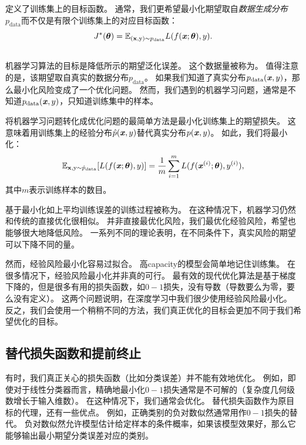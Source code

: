 定义了训练集上的目标函数。
通常，我们更希望最小化期望取自\emph{数据生成分布}$p_{\text{data}}$而不仅是有限个训练集上的对应目标函数：
\begin{equation}
\label{eq:8.2}
    J^*(\boldsymbol{\theta}) = \mathbb{E}_{(\mathbf{x}, \mathrm{y}) \sim p_\text{data}} L(f(\boldsymbol{\mathit{x}} ;\boldsymbol{\theta}),y).
\end{equation}

\subsection{}
\label{sec:empirical_risk_minimization}
机器学习算法的目标是降低所示的期望泛化误差。
这个数据量被称为。
值得注意的是，该期望取自真实的数据分布$p_\text{data}$。
如果我们知道了真实分布$p_\text{data}(\boldsymbol{\mathit{x}}, y)$，那么最小化风险变成了一个优化问题。
然而，我们遇到的机器学习问题，通常是不知道$p_\text{data}(\boldsymbol{\mathit{x}}, y)$，只知道训练集中的样本。


将机器学习问题转化成优化问题的最简单方法是最小化训练集上的期望损失。
这意味着用训练集上的经验分布$\hat{p}(\boldsymbol{\mathit{x}},y)$替代真实分布$p(\boldsymbol{\mathit{x}},y)$。
如此，我们将最小化：
\begin{equation}
\label{eq:8.3}
    \mathbb{E}_{\mathbf{x}, \mathrm{y} \sim \hat{p}_\text{data}} [L(f(\boldsymbol{\mathit{x}} ; \boldsymbol{\theta}), y)]
    = \frac{1}{m} \sum_{i=1}^m L( f(\boldsymbol{\mathit{x}}^{(i)}; \boldsymbol{\theta}), y^{(i)}) ,
\end{equation}
其中$m$表示训练样本的数目。

基于最小化如上平均训练误差的训练过程被称为。
在这种情况下，机器学习仍然和传统的直接优化很相似。
并非直接最优化风险，我们最优化经验风险，希望也能够很大地降低风险。
一系列不同的理论表明，在不同条件下，真实风险的期望可以下降不同的量。

然而，经验风险最小化容易过拟合。
高\gls{capacity}的模型会简单地记住训练集。
在很多情况下，经验风险最小化并非真的可行。
最有效的现代优化算法是基于梯度下降的，但是很多有用的损失函数，如$0-1$损失，没有导数（导数要么为零，要么没有定义）。
这两个问题说明，在深度学习中我们很少使用经验风险最小化。
反之，我们会使用一个稍稍不同的方法，我们真正优化的目标会更加不同于我们希望优化的目标。

\subsection{替代损失函数和提前终止}
\label{sec:surrogate_loss_functions_and_early_stopping}
有时，我们真正关心的损失函数（比如分类误差）并不能有效地优化。
例如，即使对于线性分类器而言，精确地最小化$0-1$损失通常是不可解的（复杂度几何级数增长于输入维数）\citep{Marcotte-92}。
在这种情况下，我们通常会优化。
替代损失函数作为原目标的代理，还有一些优点。  
例如，正确类别的负对数似然通常用作$0-1$损失的替代。
负对数似然允许模型估计给定样本的条件概率，如果该模型效果好，那么它能够输出最小期望分类误差对应的类别。

